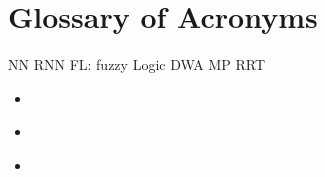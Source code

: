 \chapter*{Glossary of Acronyms}

NN
RNN
FL: fuzzy Logic
DWA
MP
RRT

\begin{itemize}
    \item \textbf{} 
    \item \textbf{} 

    \newpage
    \thispagestyle{acronyms}
    \item \textbf{} 

\end{itemize}

\newpage







